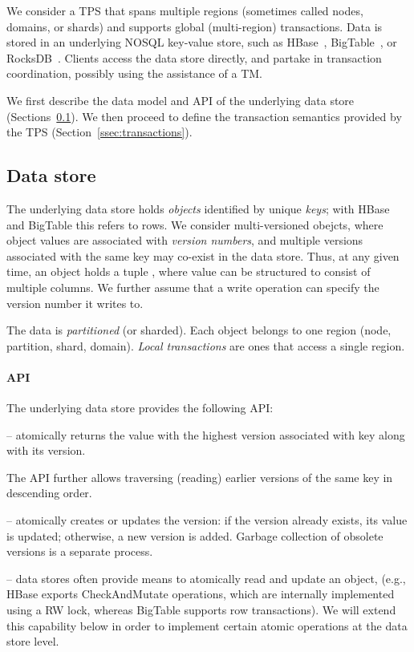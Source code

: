 

We consider a TPS  that spans multiple regions (sometimes called nodes, domains, or shards) and supports global
(multi-region) transactions. Data is stored in an underlying NOSQL key-value store, 
such as HBase~\cite{hbase}, BigTable~\cite{bigtable-osdi06},  or
RocksDB~\cite{rocksdb}. Clients access the data store directly, and partake in transaction
coordination, possibly using the assistance of a TM.

We first describe the data model and API of the underlying data store (Sections~\ref{ssec:data-model}).
We then proceed to define  the transaction semantics provided by the TPS (Section~\ref{ssec:transactions}). 

\subsection{Data store}
\label{ssec:data-model}

The underlying data store holds  \emph{objects}  identified by unique \emph{keys}; with HBase and BigTable this refers to rows.
We consider multi-versioned obejcts, where object values are associated with \emph{version numbers}, and
multiple versions associated with the same key may co-exist in the data store.
Thus, at any given time, an object holds a tuple , where value
can be structured to consist of multiple columns.
We further assume that a write operation can specify the version number it writes to.

The data is \emph{partitioned} (or sharded). Each object belongs to one region
(node, partition, shard, domain). \emph{Local transactions} are ones that access
a single region.

\paragraph{API} 

The underlying data store provides the following API:
\begin{description}
\item [] -- atomically returns the value with
the highest version associated with key along with its version.
\item The API further allows traversing (reading) earlier versions of the same
key in descending order.
\item [\code{write(key,value,version)}] -- atomically creates or updates the version:
if the version already exists, its value is updated;
otherwise, a new version is added. Garbage collection of obsolete versions is a separate
process.
\item [Read-modify-write] --  data stores often provide means to atomically read and
update an object, (e.g., HBase exports CheckAndMutate operations, which are 
internally implemented using a RW lock, whereas BigTable supports row transactions). We
will extend this capability below in order to implement certain atomic
operations at the data store level.
\end{description}

